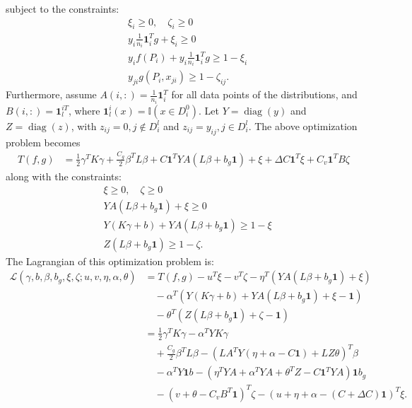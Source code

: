\documentclass[12pt]{article}
\DeclareMathOperator{\diag}{diag}
\begin{document}
	subject to the constraints:
	\begin{align}
		&\xi_i \ge 0, \quad \zeta_i \ge 0 \\
		&y_i \frac{1}{n_i} \mathbf{1}_i^T g + \xi_i \ge 0 \\
		&y_i f(P_i) + y_i \frac{1}{n_i} \mathbf{1}_i^T g \ge 1 - \xi_i \\
		&y_{ji} g(P_i, x_{ji}) \ge 1 - \zeta_{ij}.
	\end{align}
	Furthermore, assume $A(i, :) = \frac{1}{n_i} \mathbf{1}_i^T$ for all data points of the distributions, and $B(i, :) = \mathbf{1}_l^{iT}$, where $\mathbf{1}_l^i(x) = \mathbb{I}(x \in D_i^0)$. Let $Y = \diag(y)$ and $Z = \diag(z)$, with $z_{ij} = 0, j \notin D_i^l$ and $z_{ij} = y_{ij}, j \in D_i^l$. The above optimization problem becomes
	\begin{align}
		T(f, g) &= \frac{1}{2} \gamma^T K \gamma + \frac{C_g}{2} \beta^T L \beta + C \mathbf{1}^T Y A (L\beta + b_g \mathbf{1}) + \xi + \Delta C \mathbf{1}^T \xi + C_v \mathbf{1}^T B \zeta
	\end{align}
	along with the constraints:
	\begin{align}
		&\xi \ge 0, \quad \zeta \ge 0 \\
		&Y A (L\beta + b_g \mathbf{1}) + \xi \ge 0 \\
		&Y (K\gamma + b) + Y A (L\beta + b_g \mathbf{1}) \ge 1 - \xi \\
		&Z (L\beta + b_g \mathbf{1}) \ge 1 - \zeta.
	\end{align}
	The Lagrangian of this optimization problem is:
	\begin{align}
		\mathcal{L}(\gamma, b, \beta, b_g, \xi, \zeta; u, v, \eta, \alpha, \theta) &= T(f, g) - u^T \xi - v^T \zeta - \eta^T (Y A (L\beta + b_g \mathbf{1}) + \xi) \\
		&\quad - \alpha^T (Y (K\gamma + b) + Y A (L\beta + b_g \mathbf{1}) + \xi - \mathbf{1}) \\
		&\quad - \theta^T (Z (L\beta + b_g \mathbf{1}) + \zeta - \mathbf{1}) \\
		&= \frac{1}{2} \gamma^T K \gamma - \alpha^T Y K \gamma \\
		&\quad + \frac{C_g}{2} \beta^T L \beta - \left( L A^T Y (\eta + \alpha - C \mathbf{1}) + L Z \theta \right)^T \beta \\
		&\quad - \alpha^T Y \mathbf{1} b - \left( \eta^T Y A + \alpha^T Y A + \theta^T Z - C \mathbf{1}^T Y A \right) \mathbf{1} b_g \\
		&\quad - (v + \theta - C_v B^T \mathbf{1})^T \zeta - (u + \eta + \alpha - (C + \Delta C) \mathbf{1})^T \xi.
	\end{align}
\end{document}
